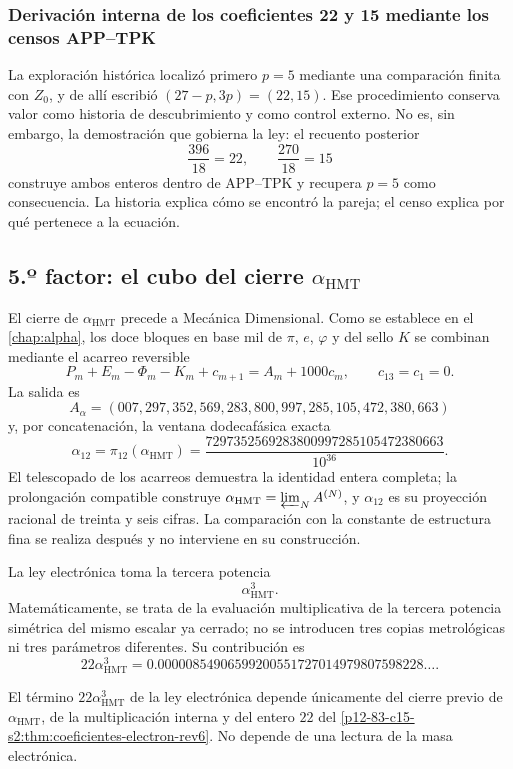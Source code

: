 \subsubsection{Derivación interna de los coeficientes 22 y 15 mediante los censos APP--TPK}

La exploración histórica localizó primero \(p=5\) mediante una comparación
finita con \(Z_0\), y de allí escribió
\((27-p,3p)=(22,15)\). Ese procedimiento conserva valor como historia de
descubrimiento y como control externo. No es, sin embargo, la demostración
que gobierna la ley: el recuento posterior
\[
 \frac{396}{18}=22,
 \qquad
 \frac{270}{18}=15
\]
construye ambos enteros dentro de APP--TPK y recupera \(p=5\) como
consecuencia. La historia explica cómo se encontró la pareja; el censo
explica por qué pertenece a la ecuación.

\subsection{5.º factor: el cubo del cierre \(\alpha_{\mathrm{HMT}}\)}

El cierre de \(\alpha_{\mathrm{HMT}}\) precede a Mecánica Dimensional.
Como se establece en el \cref{chap:alpha}, los doce bloques en base mil
de \(\pi\), \(e\), \(\varphi\) y del sello \(K\) se combinan mediante el
acarreo reversible
\[
 P_m+E_m-\Phi_m-K_m+c_{m+1}
 =A_m+1000c_m,
 \qquad c_{13}=c_1=0.
\]
La salida es
\[
 A_\alpha=
 (007,297,352,569,283,800,997,285,105,472,380,663)
\]
y, por concatenación, la ventana dodecafásica exacta
\[
 \alpha_{12}=\pi_{12}(\alpha_{\mathrm{HMT}})
 =
 \frac{
 7297352569283800997285105472380663
 }{10^{36}}.
\]
El telescopado de los acarreos demuestra la identidad entera completa; la
prolongación compatible construye
\(\alpha_{\mathrm{HMT}}=\varprojlim_N A^{(N)}\), y \(\alpha_{12}\) es su
proyección racional de treinta y seis cifras. La
comparación con la constante de estructura fina se realiza después y no
interviene en su construcción.

La ley electrónica toma la tercera potencia
\[
 \alpha_{\mathrm{HMT}}^3.
\]
Matemáticamente, se trata de la evaluación multiplicativa de la tercera
potencia simétrica del mismo escalar ya cerrado; no se introducen tres
copias metrológicas ni tres parámetros diferentes. Su contribución es
\[
 22\alpha_{\mathrm{HMT}}^3
 =
 0.00000854906599200551727014979807598228\ldots.
\]

\begin{proposition}
\label{p12-83-c15-s2:prop:alpha-cubica-electron-rev6}
El término \(22\alpha_{\mathrm{HMT}}^3\) de la ley electrónica depende
únicamente del cierre previo de \(\alpha_{\mathrm{HMT}}\), de la
multiplicación interna y del entero \(22\) del
\cref{p12-83-c15-s2:thm:coeficientes-electron-rev6}. No depende de una lectura de la
masa electrónica.
\end{proposition}

